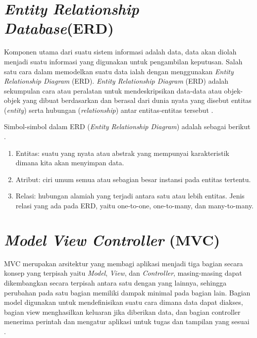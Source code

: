 \section{\emph{Entity Relationship Database}(ERD)}

Komponen utama dari suatu sistem informasi adalah data, data akan diolah menjadi suatu informasi yang digunakan untuk pengambilan keputusan. Salah satu cara dalam memodelkan suatu data ialah dengan menggunakan \textit{Entity Relationship Diagram} (ERD).\textit{ Entity Relationship Diagram} (ERD) adalah sekumpulan cara atau peralatan untuk mendeskripsikan data-data atau objek-objek yang dibuat berdasarkan dan berasal dari dunia nyata yang disebut entitas (\textit{entity}) serta hubungan (\textit{relationship}) antar entitas-entitas tersebut \cite{DoroEdi}. 

Simbol-simbol dalam ERD (\textit{Entity Relationship Diagram}) adalah sebagai berikut \cite{Fridayanthie}.
\begin{enumerate}
	\item Entitas: suatu yang nyata atau abstrak yang mempunyai karakteristik dimana kita akan menyimpan data.
	\item Atribut: ciri umum semua atau sebagian besar instansi pada entitas tertentu.
	\item Relasi: hubungan alamiah yang terjadi antara satu atau lebih entitas. Jenis relasi yang ada pada ERD, yaitu one-to-one, one-to-many, dan many-to-many.
	
\end{enumerate}



\section{\emph{Model View Controller} (MVC)}

MVC merupakan arsitektur yang membagi aplikasi menjadi tiga bagian secara konsep yang terpisah yaitu \textit{Model}, \textit{View}, dan \textit{Controller}, masing-masing dapat dikembangkan secara terpisah antara satu dengan yang lainnya, sehingga perubahan pada satu bagian memiliki dampak minimal pada bagian lain. Bagian model digunakan untuk mendefinisikan suatu cara dimana data dapat diakses, bagian view menghasilkan keluaran jika diberikan data, dan bagian controller menerima perintah dan mengatur aplikasi untuk tugas dan tampilan yang sesuai \cite{AriefHidayat}. 

